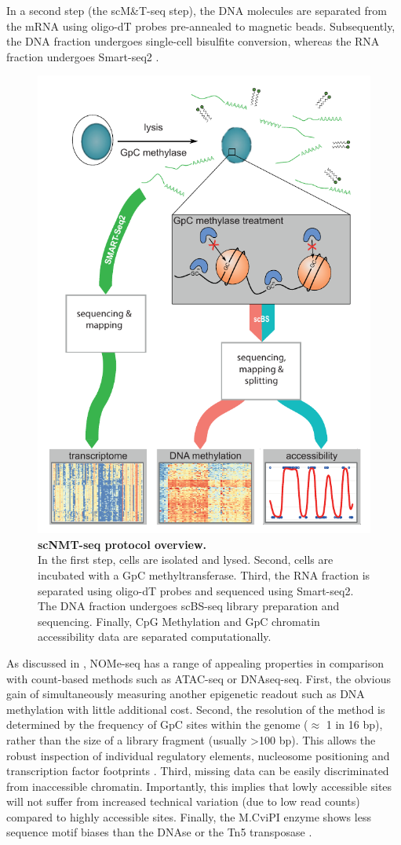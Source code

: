 In a second step (the scM\&T-seq step), the DNA molecules are separated from the mRNA using oligo-dT probes pre-annealed to magnetic beads. Subsequently, the DNA fraction undergoes single-cell bisulfite conversion\cite{Smallwood2014}, whereas the RNA fraction undergoes Smart-seq2 \cite{Picelli2014}.\\

\begin{figure}[H]
	\centering
	\includegraphics[width=0.55\linewidth]{scNMT_protocol}
	\caption[]{\textbf{scNMT-seq protocol overview.}\\
	In the first step, cells are isolated and lysed. Second, cells are incubated with a GpC methyltransferase. Third, the RNA fraction is separated using oligo-dT probes and sequenced using Smart-seq2. The DNA fraction undergoes scBS-seq library preparation and sequencing. Finally, CpG Methylation and GpC chromatin accessibility data are separated computationally.}
	\label{fig:scnmt_protocol}
\end{figure}

As discussed in , NOMe-seq has a range of appealing properties in comparison with count-based methods such as ATAC-seq or DNAseq-seq. First, the obvious gain of simultaneously measuring another epigenetic readout such as DNA methylation with little additional cost. Second, the resolution of the method is determined by the frequency of GpC sites within the genome ($\approx$ 1 in 16 bp), rather than the size of a library fragment (usually >100 bp). This allows the robust inspection of individual regulatory elements, nucleosome positioning and transcription factor footprints \cite{Kelly2012,Pott2016,Nordstrom2019}. Third, missing data can be easily discriminated from inaccessible chromatin. Importantly, this implies that lowly accessible sites will not suffer from increased technical variation (due to low read counts) compared to highly accessible sites. Finally, the M.CviPI enzyme shows less sequence motif biases than the DNAse or the Tn5 transposase \cite{Nordstrom2019}.

